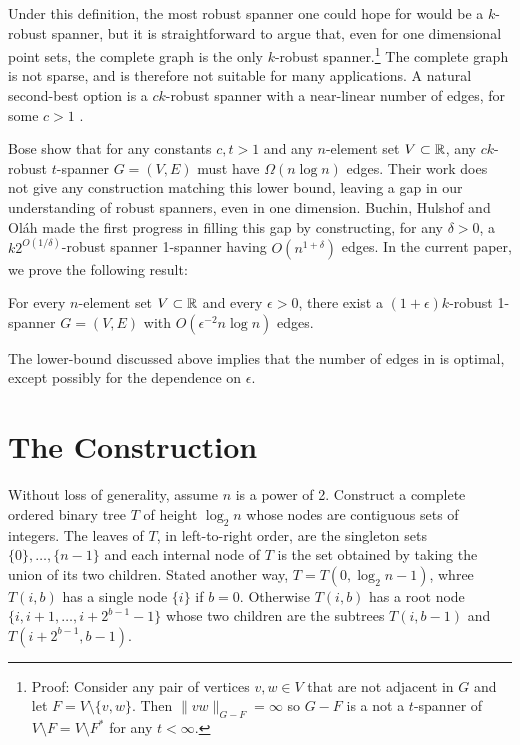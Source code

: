 \documentclass{patmorin}
\begin{document}
Under this definition, the most robust spanner one could hope for
would be a $k$-robust spanner, but it is straightforward to argue
that, even for one dimensional point sets, the complete graph is the
only $k$-robust spanner.\footnote{Proof: Consider any pair of vertices
$v,w\in V$ that are not adjacent in $G$ and let $F=V\setminus\{v,w\}$.
Then $\|vw\|_{G-F}=\infty$ so $G-F$ is a not a $t$-spanner of $V\setminus
F=V\setminus F^*$ for any $t<\infty$.} The complete graph is not sparse,
and is therefore not suitable for many applications. A natural second-best
option is a $ck$-robust spanner with a near-linear number of edges,
for some $c>1$ .

Bose \etal \cite[Theorem~3]{bose.dujmovic.ea:robust} show that for any
constants $c,t>1$ and any $n$-element set $V\subset\mathbb{R}$, any $ck$-robust
$t$-spanner $G=(V,E)$ must have $\Omega(n\log n)$ edges.  Their work
does not give any construction matching this lower bound, leaving a
gap in our understanding of robust spanners, even in one dimension.
Buchin, Hulshof and Ol\'ah \cite{buchin.hulshof.olah:robust} made the
first progress in filling this gap by constructing, for any $\delta>0$,
a $k2^{O(1/\delta)}$-robust spanner 1-spanner having $O(n^{1+\delta})$
edges.  In the current paper, we prove the following result:

\begin{thm}
  For every $n$-element set $V\subset\mathbb{R}$ and every $\epsilon>0$,
  there exist a $(1+\epsilon)k$-robust 1-spanner $G=(V,E)$ with
  $O(\epsilon^{-2}n\log n)$ edges.
\end{thm}

The lower-bound discussed above implies that the number of edges
in  is optimal, except possibly for the dependence on
$\epsilon$.


\section{The Construction}


Without loss of generality, assume $n$ is a power of 2.  Construct a
complete ordered binary tree $T$ of height $\log_2 n$ whose nodes are
contiguous sets of integers.  The leaves of $T$, in left-to-right order,
are the singleton sets $\{0\},\ldots,\{n-1\}$ and each internal node of
$T$ is the set obtained by taking the union of its two children.  Stated
another way, $T=T(0,\log_2 n-1)$, whree $T(i,b)$ has a single node $\{i\}$
if $b=0$. Otherwise $T(i,b)$ has a root node $\{i,i+1,\ldots,i+2^{b-1}-1\}$
whose two children are the subtrees $T(i,b-1)$ and $T(i+2^{b-1}, b-1)$.
\end{document}
